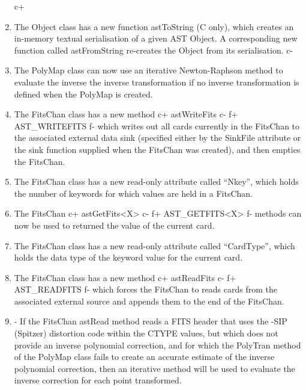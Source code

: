 \documentclass[twoside,11pt]{article}
\begin{document}
\begin{enumerate}

c+
\item The Object class has a new function astToString (C only), which creates
an in-memory textual serialisation of a given AST Object. A corresponding
new function called astFromString re-creates the Object from its
serialisation.
c-

\item The PolyMap class can now use an iterative Newton-Raphson method to
evaluate the inverse the inverse transformation if no inverse
transformation is defined when the PolyMap is created.

\item The FitsChan class has a new method
c+
astWriteFits
c-
f+
AST\_WRITEFITS
f-
which writes out all cards currently in the FitsChan to the associated
external data sink (specified either by the SinkFile attribute or the
sink function supplied when the FitsChan was created), and then empties
the FitsChan.

\item The FitsChan class has a new read-only attribute called ``Nkey'', which
holds the number of keywords for which values are held in a FitsChan.

\item The FitsChan
c+
astGetFits<X>
c-
f+
AST\_GETFITS<X>
f-
methods can now be used to returned the value of the current card.

\item The FitsChan class has a new read-only attribute called ``CardType'', which
holds the data type of the keyword value for the current card.

\item The FitsChan class has a new method
c+
astReadFits
c-
f+
AST\_READFITS
f-
which forces the FitsChan to reads cards from the associated external
source and appends them to the end of the FitsChan.

\item - If the FitsChan astRead method reads a FITS header that uses the
-SIP (Spitzer) distortion code within the CTYPE values, but which does
not provide an inverse polynomial correction, and for which the PolyTran
method of the PolyMap class fails to create an accurate estimate of the
inverse polynomial correction, then an iterative method will be used to
evaluate the inverse correction for each point transformed.

\end{enumerate}
\end{document}
